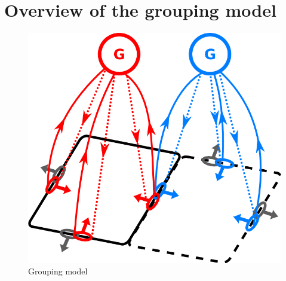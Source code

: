 \section{Overview of the grouping model}
\begin{figure}[t]
\centering
\includegraphics[width=\textwidth]{Intro/figs/groupingcircuit}
\makeatletter
\let\@currsize\normalsize
\caption{Grouping model}
\label{fig:GroupingModel}
\end{figure}

